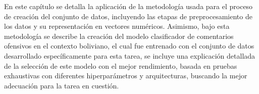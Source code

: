 En este capítulo se detalla la aplicación de la metodología usada para el proceso de creación del conjunto de datos, incluyendo las etapas de preprocesamiento de los datos y su representación en vectores numéricos. Asimismo, bajo esta metodología se describe la creación del modelo clasificador de comentarios ofensivos en el contexto boliviano, el cual fue entrenado con el conjunto de datos desarrollado específicamente para esta tarea, se incluye una explicación detallada de la selección de este modelo con el mejor rendimiento, basada en pruebas exhaustivas con diferentes hiperparámetros y arquitecturas, buscando la mejor adecuación para la tarea en cuestión.
